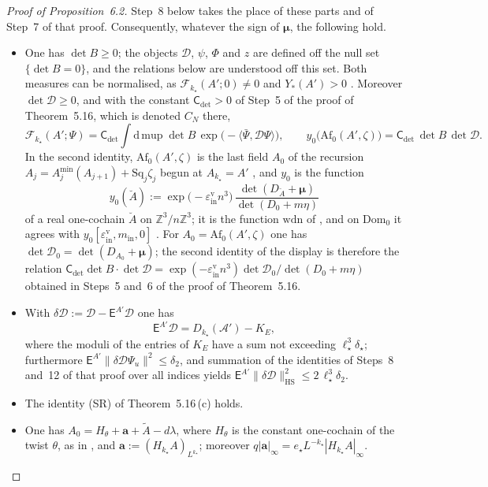 \documentclass[11pt]{amsart}
\theoremstyle{definition}
\begin{document}
\begin{proof}[Proof of Proposition~6.2]
Step~8 below takes the place of these parts and of Step~7 of that proof.
Consequently, whatever the sign of $\boldsymbol\mu$, the following hold.
\begin{itemize}
\item[(i)] One has $\det B\ge0$;
the objects $\mathcal D$, $\psi$, $\Phi$ and $z$ are defined off the null set $\{\det B=0\}$, and the relations below are understood off this set.
Both measures can be normalised, as $\mathscr F_{k_\star}(A';0)\ne0$ and $Y_*(A')>0$ \cite[Proposition~32.1]{QEDIII}.
Moreover $\det\mathcal D\ge0$, and with the constant $\mathsf C_{\det}>0$ of Step~5 of the proof of Theorem~5.16, which is denoted $C_N$ there,
\begin{equation*}
\mathscr F_{k_\star}(A';\Psi)=\mathsf C_{\det}\int\mathrm d\,\mathrm{mup}\;\det B\,\exp\bigl(-\langle\bar\Psi,\mathcal D\Psi\rangle\bigr),\qquad y_0\bigl(\mathrm{Af}_0(A',\zeta)\bigr)=\mathsf C_{\det}\,\det B\,\det\mathcal D .
\end{equation*}
In the second identity, $\mathrm{Af}_0(A',\zeta)$ is the last field $A_0$ of the recursion $A_j=A^{\min}_j(A_{j+1})+\mathrm{Sq}_j\zeta_j$ begun at $A_{k_\star}=A'$ \cite[Sections~I.5.7, G4.0.6]{QEDIII}, and $y_0$ is the function
\begin{equation*}
y_0(\breve A):=\exp\bigl(-\varepsilon^{\mathrm v}_{\mathrm{in}}n^3\bigr)\,\frac{\det(D_{\breve A}+\boldsymbol\mu)}{\det(D_0+m\eta)}
\end{equation*}
of a real one-cochain $\breve A$ on $\mathbb Z^3/n\mathbb Z^3$;
it is the function $\mathrm{wdn}$ of \cite[Chapter~29, (29.1)]{QEDIII}, and on $\mathrm{Dom}_0$ it agrees with $y_0[\varepsilon^{\mathrm v}_{\mathrm{in}},m_{\mathrm{in}},0]$ \cite[Section~I.5.7; Chapter~29, Lemma~1\,(iv)]{QEDIII}.
For $A_0=\mathrm{Af}_0(A',\zeta)$ one has $\det\mathcal D_0=\det(D_{A_0}+\boldsymbol\mu)$;
the second identity of the display is therefore the relation $\mathsf C_{\det}\det B\cdot\det\mathcal D=\allowbreak \exp(-\varepsilon^{\mathrm v}_{\mathrm{in}}n^3)\det\mathcal D_0/\det(D_0+m\eta)$ obtained in Steps~5 and~6 of the proof of Theorem~5.16.
\item[(ii)] With $\delta\mathcal D:=\mathcal D-\mathsf E^{A'}\mathcal D$ one has
\begin{equation*}
\mathsf E^{A'}\mathcal D=D_{k_\star}(\mathscr A')-K_E,
\end{equation*}
where the moduli of the entries of $K_E$ have a sum not exceeding $\ell_\star^3\delta_\star$;
furthermore $\mathsf E^{A'}\|\delta\mathcal D\Psi_u\|^2\le\delta_2$, and summation of the identities of Steps~8 and~12 of that proof over all indices yields $\mathsf E^{A'}\|\delta\mathcal D\|^2_{\mathrm{HS}}\le2\,\allowbreak \ell_\star^3\delta_2$.
\item[(iii)] The identity (SR) of Theorem~5.16\,(c) holds.
\item[(iv)] One has $A_0=H_\theta+\mathbf a+\tilde A-d\lambda$, where $H_\theta$ is the constant one-cochain of the twist $\theta$, as in \cite[Section~I.6.6]{QEDIII}, and $\mathbf a:=(H_{k_\star}A)_{L^{k_\star}}$;
moreover $q|\mathbf a|_\infty=e_\star L^{-k_\star}|H_{k_\star}A|_\infty$.
\end{itemize}


\end{proof}
\end{document}
